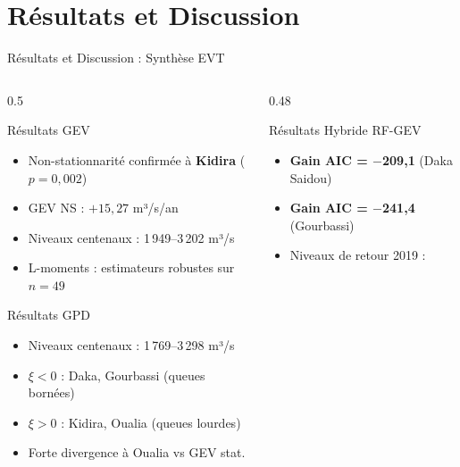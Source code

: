 \documentclass[aspectratio=169, 9pt]{beamer}
\begin{document}
\section{Résultats et Discussion}

\begin{frame}{Résultats et Discussion : Synthèse EVT}
\begin{columns}[T]
\begin{column}{0.5\textwidth}
  \begin{block}{Résultats GEV}
  \small
    \begin{itemize}
      \item Non-stationnarité confirmée à
            \textbf{Kidira} ($p=0{,}002$)
      \item GEV NS : $+15{,}27$ m³/s/an
      \item Niveaux centenaux :
            1\,949--3\,202 m³/s
      \item L-moments : estimateurs robustes
            sur $n=49$
    \end{itemize}
  \end{block}
  \vspace{0.1cm}
  \begin{block}{Résultats GPD}
  \small
    \begin{itemize}
      \item Niveaux centenaux :
            1\,769--3\,298 m³/s
      \item $\xi < 0$ : Daka, Gourbassi
            (queues bornées)
      \item $\xi > 0$ : Kidira, Oualia
            (queues lourdes)
      \item Forte divergence à Oualia
            vs GEV stat.
    \end{itemize}
  \end{block}
\end{column}
\begin{column}{0.48\textwidth}
  \begin{alertblock}{Résultats Hybride RF-GEV}
  \small
    \begin{itemize}
      \item \textbf{Gain AIC = $-$209,1}
            (Daka Saidou)
      \item \textbf{Gain AIC = $-$241,4}
            (Gourbassi)
      \item Niveaux de retour 2019 :
            \begin{itemize}\small

\end{itemize}
\end{itemize}
\end{alertblock}
\end{column}
\end{columns}
\end{frame}
\end{document}
